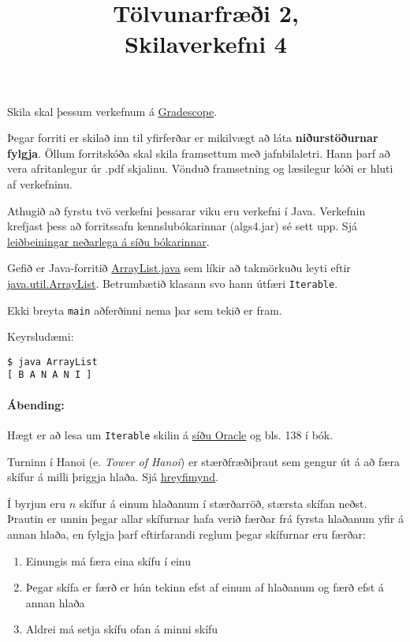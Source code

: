 \documentclass{article}
\title{Tölvunarfræði 2, \semester \\ Skilaverkefni 4}
\author{}
\begin{document}
\maketitle
{}

Skila skal þessum verkefnum á \href{https://gradescope.com/courses/14122}{Gradescope}.

Þegar forriti er skilað inn til yfirferðar er mikilvægt að láta \textbf{niðurstöðurnar fylgja}. Öllum forritskóða skal skila framsettum með jafnbilaletri. Hann þarf að vera afritanlegur úr .pdf skjalinu. Vönduð framsetning og læsilegur kóði er hluti af verkefninu.

Athugið að fyrstu tvö verkefni þessarar viku eru verkefni í Java. Verkefnin krefjast þess að forritssafn kennslubókarinnar (algs4.jar) sé sett upp. Sjá \href{http://algs4.cs.princeton.edu/code/}{leiðbeiningar neðarlega á síðu bókarinnar}.

\question

Gefið er Java-forritið \href{https://raw.githubusercontent.com/Ernir/kennsluefni/master/T2/Code/w5/ArrayList.java}{ArrayList.java} sem líkir að takmörkuðu leyti eftir \href{https://docs.oracle.com/javase/8/docs/api/java/util/ArrayList.html}{java.util.ArrayList}.  Betrumbætið klasann svo hann útfæri \texttt{Iterable}.

Ekki breyta \texttt{main} aðferðinni nema þar sem tekið er fram.

Keyrsludæmi:

\begin{verbatim}
$ java ArrayList
[ B A N A N I ]
\end{verbatim}

\paragraph{Ábending:} Hægt er að lesa um \texttt{Iterable} skilin á \href{https://docs.oracle.com/javase/8/docs/api/java/lang/Iterable.html}{síðu Oracle} og bls. 138 í bók.

\question
Turninn í Hanoi (e. \emph{Tower of Hanoi}) er stærðfræðiþraut sem gengur út á að færa skífur á milli þriggja hlaða. Sjá \href{https://www.tutorialspoint.com/data_structures_algorithms/images/tower_of_hanoi.gif}{hreyfimynd}.

Í byrjun eru $n$ skífur á einum hlaðanum í stærðarröð, stærsta skífan neðst. Þrautin er unnin þegar allar skífurnar hafa verið færðar frá fyrsta hlaðanum yfir á annan hlaða, en fylgja þarf eftirfarandi reglum þegar skífurnar eru færðar:
\begin{enumerate}
	\item Einungis má færa eina skífu í einu
	\item Þegar skífa er færð er hún tekinn efst af einum af hlaðanum og færð efst á annan hlaða
	\item Aldrei má setja skífu ofan á minni skífu
\end{enumerate}
\end{document}
